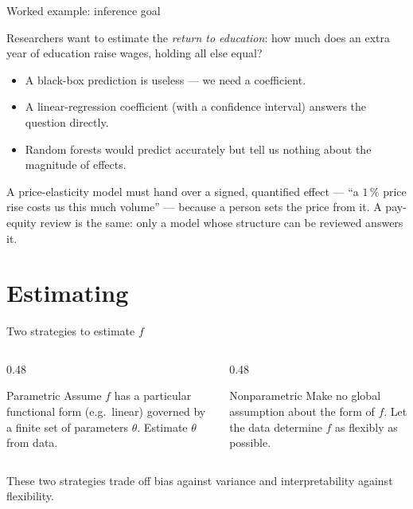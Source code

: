 \documentclass[aspectratio=169,11pt]{beamer}
\begin{document}
\begin{frame}{Worked example: inference goal}
  \begin{numexample}
    Researchers want to estimate the \emph{return to education}: how
    much does an extra year of education raise wages, holding all
    else equal?
    \begin{itemize}
      \item A black-box prediction is useless --- we need a coefficient.
      \item A linear-regression coefficient (with a confidence
            interval) answers the question directly.
      \item Random forests would predict accurately but tell us
            nothing about the magnitude of effects.
    \end{itemize}
  \end{numexample}
  \begin{industry}
    A price-elasticity model must hand over a signed, quantified effect --- ``a $1\,\%$ price
    rise costs us this much volume'' --- because a person sets the price from it. A pay-equity
    review is the same: only a model whose structure can be reviewed answers it.
  \end{industry}
\end{frame}


\section{Estimating}

\begin{frame}{Two strategies to estimate $f$}
  \begin{columns}[T]
    \begin{column}{0.48\textwidth}
      \begin{block}{Parametric}
        Assume $f$ has a particular functional form (e.g.\ linear)
        governed by a finite set of parameters $\theta$. Estimate
        $\theta$ from data.
      \end{block}
    \end{column}
    \begin{column}{0.48\textwidth}
      \begin{block}{Nonparametric}
        Make no global assumption about the form of $f$. Let the
        data determine $f$ as flexibly as possible.
      \end{block}
    \end{column}
  \end{columns}
  \begin{takeaway}
    These two strategies trade off bias against variance and
    interpretability against flexibility.
  \end{takeaway}
\end{frame}
\end{document}
